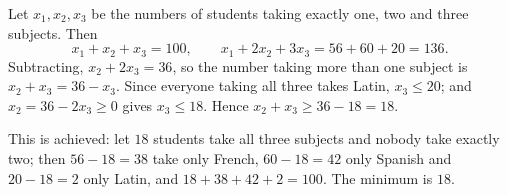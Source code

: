 Let $x_1,x_2,x_3$ be the numbers of students taking exactly one, two and three subjects. Then
\[
x_1+x_2+x_3=100,\qquad x_1+2x_2+3x_3=56+60+20=136 .
\]
Subtracting, $x_2+2x_3=36$, so the number taking more than one subject is $x_2+x_3=36-x_3$. Since everyone taking all three takes Latin, $x_3\le20$; and $x_2=36-2x_3\ge0$ gives $x_3\le18$. Hence $x_2+x_3\ge36-18=18$.

This is achieved: let $18$ students take all three subjects and nobody take exactly two; then $56-18=38$ take only French, $60-18=42$ only Spanish and $20-18=2$ only Latin, and $18+38+42+2=100$. The minimum is $\boxed{18}$.
